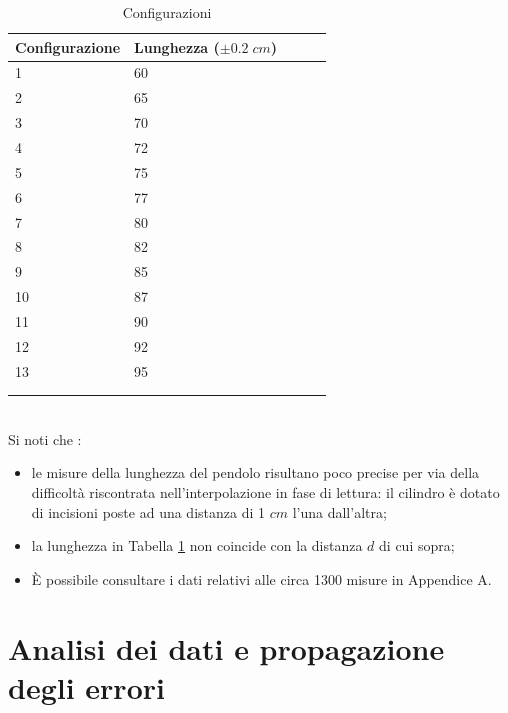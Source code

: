 \documentclass[11pt,a4paper]{article}
\begin{document}
\begin{longtable}[]{@{}lllll@{}}
    \toprule
    Configurazione & Lunghezza ($\pm 0.2 \; cm$) \tabularnewline
    \midrule
    \endhead
1 & 60 \tabularnewline
2 & 65 \tabularnewline
3 & 70 \tabularnewline
4 & 72 \tabularnewline
5 & 75 \tabularnewline
6 & 77 \tabularnewline
7 & 80 \tabularnewline
8 & 82 \tabularnewline
9 & 85 \tabularnewline
10 & 87 \tabularnewline
11 & 90 \tabularnewline
12 & 92 \tabularnewline
13 & 95 \tabularnewline
    \bottomrule
    \\
    \caption{Configurazioni}
    \label{tab:conf}
\end{longtable}
\\
Si noti che :
\begin{itemize}
    \item le misure della lunghezza del pendolo risultano poco precise per via della difficoltà riscontrata nell'interpolazione in fase di lettura: il cilindro è dotato di incisioni poste ad una distanza di 1 $cm$ l'una dall'altra;
    
    \item la lunghezza in Tabella \ref{tab:conf} non coincide con la distanza $d$ di cui sopra;
    
    \item È possibile consultare i dati relativi alle circa 1300 misure in Appendice A.
\end{itemize}


\section{Analisi dei dati e propagazione degli errori}
\end{document}
